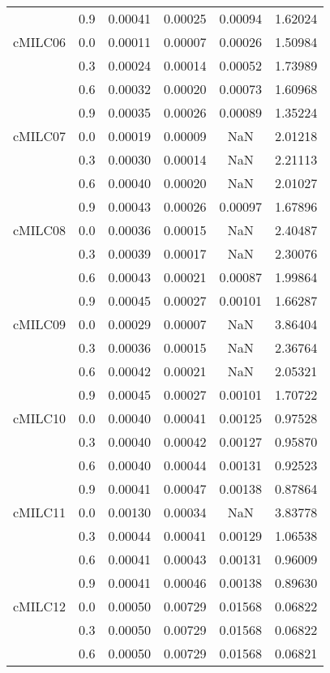 \begin{longtable}{cccccc}
        & 0.9 & 0.00041 & 0.00025 & 0.00094 & 1.62024 \\
cMILC06 & 0.0 & 0.00011 & 0.00007 & 0.00026 & 1.50984 \\
        & 0.3 & 0.00024 & 0.00014 & 0.00052 & 1.73989 \\
        & 0.6 & 0.00032 & 0.00020 & 0.00073 & 1.60968 \\
        & 0.9 & 0.00035 & 0.00026 & 0.00089 & 1.35224 \\
cMILC07 & 0.0 & 0.00019 & 0.00009 & NaN & 2.01218 \\
        & 0.3 & 0.00030 & 0.00014 & NaN & 2.21113 \\
        & 0.6 & 0.00040 & 0.00020 & NaN & 2.01027 \\
        & 0.9 & 0.00043 & 0.00026 & 0.00097 & 1.67896 \\
cMILC08 & 0.0 & 0.00036 & 0.00015 & NaN & 2.40487 \\
        & 0.3 & 0.00039 & 0.00017 & NaN & 2.30076 \\
        & 0.6 & 0.00043 & 0.00021 & 0.00087 & 1.99864 \\
        & 0.9 & 0.00045 & 0.00027 & 0.00101 & 1.66287 \\
cMILC09 & 0.0 & 0.00029 & 0.00007 & NaN & 3.86404 \\
        & 0.3 & 0.00036 & 0.00015 & NaN & 2.36764 \\
        & 0.6 & 0.00042 & 0.00021 & NaN & 2.05321 \\
        & 0.9 & 0.00045 & 0.00027 & 0.00101 & 1.70722 \\
cMILC10 & 0.0 & 0.00040 & 0.00041 & 0.00125 & 0.97528 \\
        & 0.3 & 0.00040 & 0.00042 & 0.00127 & 0.95870 \\
        & 0.6 & 0.00040 & 0.00044 & 0.00131 & 0.92523 \\
        & 0.9 & 0.00041 & 0.00047 & 0.00138 & 0.87864 \\
cMILC11 & 0.0 & 0.00130 & 0.00034 & NaN & 3.83778 \\
        & 0.3 & 0.00044 & 0.00041 & 0.00129 & 1.06538 \\
        & 0.6 & 0.00041 & 0.00043 & 0.00131 & 0.96009 \\
        & 0.9 & 0.00041 & 0.00046 & 0.00138 & 0.89630 \\
cMILC12 & 0.0 & 0.00050 & 0.00729 & 0.01568 & 0.06822 \\
        & 0.3 & 0.00050 & 0.00729 & 0.01568 & 0.06822 \\
        & 0.6 & 0.00050 & 0.00729 & 0.01568 & 0.06821 \\

\end{longtable}
